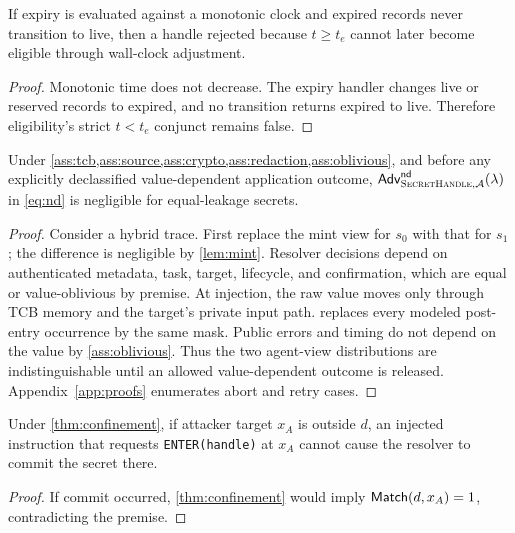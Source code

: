 \begin{proposition}
\label{prop:expiry}
If expiry is evaluated against a monotonic clock and expired records never transition to live, then a handle rejected because $t\ge t_e$ cannot later become eligible through wall-clock adjustment.
\end{proposition}

\begin{proof}
Monotonic time does not decrease. The expiry handler changes live or reserved records to expired, and no transition returns expired to live. Therefore eligibility's strict $t<t_e$ conjunct remains false.
\end{proof}

\begin{theorem}
\label{thm:nondisclosure}
Under \cref{ass:tcb,ass:source,ass:crypto,ass:redaction,ass:oblivious}, and before any explicitly declassified value-dependent application outcome, $\mathsf{Adv}^{\mathsf{nd}}_{\textsc{SecretHandle},\mathcal{A}}(\lambda)$ in \cref{eq:nd} is negligible for equal-leakage secrets.
\end{theorem}

\begin{proof}
Consider a hybrid trace. First replace the mint view for $s_0$ with that for $s_1$; the difference is negligible by \cref{lem:mint}. Resolver decisions depend on authenticated metadata, task, target, lifecycle, and confirmation, which are equal or value-oblivious by premise. At injection, the raw value moves only through TCB memory and the target's private input path.  replaces every modeled post-entry occurrence by the same mask. Public errors and timing do not depend on the value by \cref{ass:oblivious}. Thus the two agent-view distributions are indistinguishable until an allowed value-dependent outcome is released. Appendix~\ref{app:proofs} enumerates abort and retry cases.
\end{proof}

\begin{corollary}
\label{cor:redirection}
Under \cref{thm:confinement}, if attacker target $x_A$ is outside $d$, an injected instruction that requests \texttt{ENTER(handle)} at $x_A$ cannot cause the resolver to commit the secret there.
\end{corollary}

\begin{proof}
If commit occurred, \cref{thm:confinement} would imply $\mathsf{Match}(d,x_A)=1$, contradicting the premise.
\end{proof}

